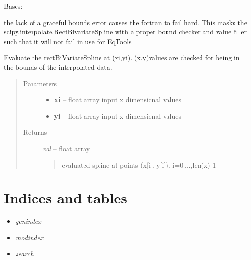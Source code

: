 \documentclass[letterpaper,10pt,english]{sphinxmanual}
\begin{document}

\begin{fulllineitems}
\label{eqtools:eqtools.trispline.RectBivariateSpline}
Bases: 

the lack of a graceful bounds error causes the fortran to fail hard. This masks the
scipy.interpolate.RectBivariateSpline with a proper bound checker and value filler
such that it will not fail in use for EqTools

\begin{fulllineitems}
\label{eqtools:eqtools.trispline.RectBivariateSpline.ev}
Evaluate the rectBiVariateSpline at (xi,yi).  (x,y)values are
checked for being in the bounds of the interpolated data.
\begin{quote}\begin{description}
\item[{Parameters }] \leavevmode\begin{itemize}
\item {} 
\textbf{xi} --
float array
input x dimensional values

\item {} 
\textbf{yi} --
float array
input x dimensional values

\end{itemize}

\item[{Returns}] \leavevmode

\emph{val} --
float array
\begin{quote}

evaluated spline at points (x{[}i{]}, y{[}i{]}), i=0,...,len(x)-1
\end{quote}


\end{description}\end{quote}

\end{fulllineitems}


\end{fulllineitems}



\chapter{Indices and tables}
\label{index:indices-and-tables}\begin{itemize}
\item {} 
\emph{genindex}

\item {} 
\emph{modindex}

\item {} 
\emph{search}

\end{itemize}
\end{document}
